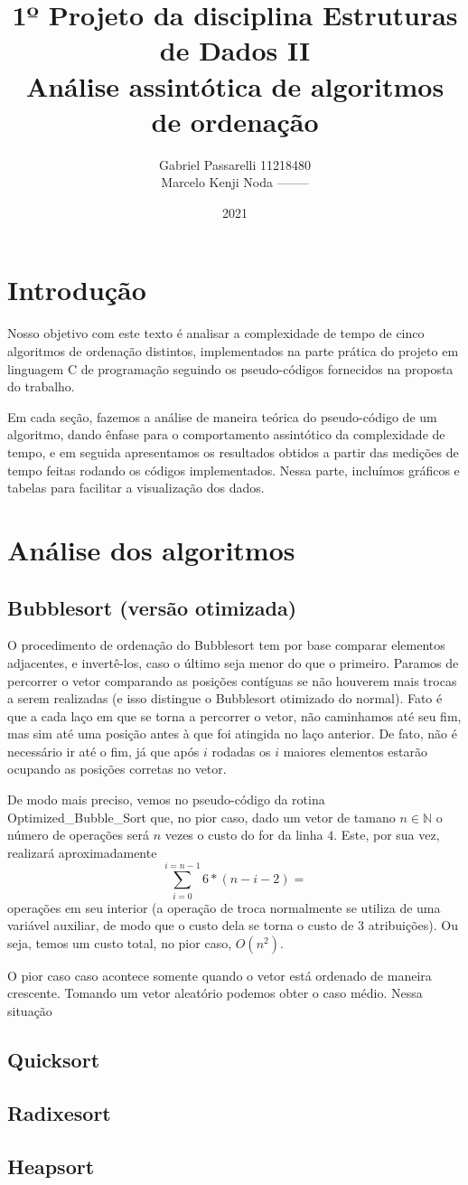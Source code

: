 \documentclass{article}
\title{%
    1º Projeto da disciplina Estruturas de Dados II \\
     \large Análise assintótica de algoritmos de ordenação}
\author{Gabriel Passarelli 11218480\\ Marcelo Kenji Noda --------}
\date{2021}
\begin{document}
%
\maketitle
%
\newpage
\section{Introdução}
Nosso objetivo com este texto é analisar a complexidade de tempo de cinco algoritmos de ordenação distintos, implementados na parte prática do projeto em linguagem C de programação seguindo os pseudo-códigos fornecidos na proposta do trabalho.\par
%
Em cada seção, fazemos a análise de maneira teórica do pseudo-código de um algoritmo, dando ênfase para o comportamento assintótico da complexidade de tempo, e em seguida apresentamos os resultados obtidos a partir das medições de tempo feitas rodando os códigos implementados. Nessa parte, incluímos gráficos e tabelas para facilitar a visualização dos dados.
%
\section{Análise dos algoritmos}
\subsection{Bubblesort (versão otimizada)}
O procedimento de ordenação do Bubblesort tem por base comparar elementos adjacentes, e invertê-los, caso o último seja menor do que o primeiro. Paramos de percorrer o vetor comparando as posições contíguas se não houverem mais trocas a serem realizadas (e isso distingue o Bubblesort otimizado do normal). Fato é que a cada laço em que se torna a percorrer o vetor, não caminhamos até seu fim, mas sim até uma posição antes à que foi atingida no laço anterior. De fato, não é necessário ir até o fim, já que após $i$ rodadas os $i$ maiores elementos estarão ocupando as posições corretas no vetor.\par
%
De modo mais preciso, vemos no pseudo-código da rotina Optimized_Bubble_Sort que, no pior caso, dado um vetor de tamano $n \in \mathbb{N}$ o número de operações será $n$ vezes o custo do for da linha $4$. Este, por sua vez, realizará aproximadamente 
\[\sum_{i = 0}^{i = n-1}6*(n-i-2) = \] 
operações em seu interior (a operação de troca normalmente se utiliza de uma variável auxiliar, de modo que o custo dela se torna o custo de 3 atribuições). Ou seja, temos um custo total, no pior caso, $O(n^2).$\par
O pior caso caso acontece somente quando o vetor está ordenado de maneira crescente. Tomando um vetor aleatório podemos obter o caso médio. Nessa situação
\subsection{Quicksort}
\subsection{Radixesort}
\subsection{Heapsort}
\end{document}
